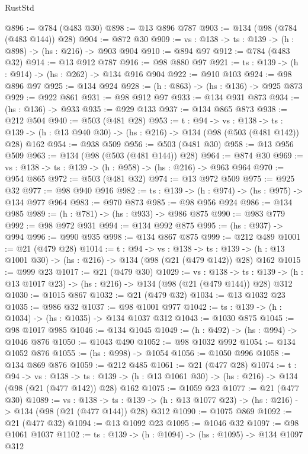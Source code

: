 \begin{lexlean}{RustStd}
\begin{coremodule}
@896 := @784 (@483 @30)
@898 := @13 @896 @787
@903 := @134 (@98 (@784 (@483 @144)) @28)
@904 := @872 @30
@909 := {vs : @138} -> {ts : @139} -> (h : @898) -> (hs : @216) -> @903 @904
@910 := @894 @97
@912 := @784 (@483 @32)
@914 := @13 @912 @787
@916 := @98 @880 @97
@921 := {ts : @139} -> (h : @914) -> (hs : @262) -> @134 @916 @904
@922 := @910 @103
@924 := @98 @896 @97
@925 := @134 @924
@928 := (h : @863) -> (hs : @136) -> @925 @873
@929 := @922 @861
@931 := @98 @912 @97
@933 := @134 @931 @873
@934 := (hs : @136) -> @933
@935 := @929 @133
@937 := @134 @865 @873
@938 := @212 @504
@940 := @503 (@481 @28)
@953 := {t : @94} ->
  {vs : @138} ->
  {ts : @139} -> (h : @13 @940 @30) -> (hs : @216) -> @134 (@98 (@503 (@481 @142)) @28) @162
@954 := @938 @509
@956 := @503 (@481 @30)
@958 := @13 @956 @509
@963 := @134 (@98 (@503 (@481 @144)) @28)
@964 := @874 @30
@969 := {vs : @138} -> {ts : @139} -> (h : @958) -> (hs : @216) -> @963 @964
@970 := @954 @865
@972 := @503 (@481 @32)
@974 := @13 @972 @509
@975 := @925 @32
@977 := @98 @940 @916
@982 := {ts : @139} -> (h : @974) -> (hs : @975) -> @134 @977 @964
@983 := @970 @873
@985 := @98 @956 @924
@986 := @134 @985
@989 := (h : @781) -> (hs : @933) -> @986 @875
@990 := @983 @779
@992 := @98 @972 @931
@994 := @134 @992 @875
@995 := (hs : @937) -> @994
@996 := @990 @935
@998 := @134 @867 @875
@999 := @212 @489
@1001 := @21 (@479 @28)
@1014 := {t : @94} ->
  {vs : @138} ->
  {ts : @139} -> (h : @13 @1001 @30) -> (hs : @216) -> @134 (@98 (@21 (@479 @142)) @28) @162
@1015 := @999 @23
@1017 := @21 (@479 @30)
@1029 := {vs : @138} ->
  {ts : @139} -> (h : @13 @1017 @23) -> (hs : @216) -> @134 (@98 (@21 (@479 @144)) @28) @312
@1030 := @1015 @867
@1032 := @21 (@479 @32)
@1034 := @13 @1032 @23
@1035 := @986 @32
@1037 := @98 @1001 @977
@1042 := {ts : @139} -> (h : @1034) -> (hs : @1035) -> @134 @1037 @312
@1043 := @1030 @875
@1045 := @98 @1017 @985
@1046 := @134 @1045
@1049 := (h : @492) -> (hs : @994) -> @1046 @876
@1050 := @1043 @490
@1052 := @98 @1032 @992
@1054 := @134 @1052 @876
@1055 := (hs : @998) -> @1054
@1056 := @1050 @996
@1058 := @134 @869 @876
@1059 := @212 @485
@1061 := @21 (@477 @28)
@1074 := {t : @94} ->
  {vs : @138} ->
  {ts : @139} -> (h : @13 @1061 @30) -> (hs : @216) -> @134 (@98 (@21 (@477 @142)) @28) @162
@1075 := @1059 @23
@1077 := @21 (@477 @30)
@1089 := {vs : @138} ->
  {ts : @139} -> (h : @13 @1077 @23) -> (hs : @216) -> @134 (@98 (@21 (@477 @144)) @28) @312
@1090 := @1075 @869
@1092 := @21 (@477 @32)
@1094 := @13 @1092 @23
@1095 := @1046 @32
@1097 := @98 @1061 @1037
@1102 := {ts : @139} -> (h : @1094) -> (hs : @1095) -> @134 @1097 @312

\end{coremodule}
\end{lexlean}
